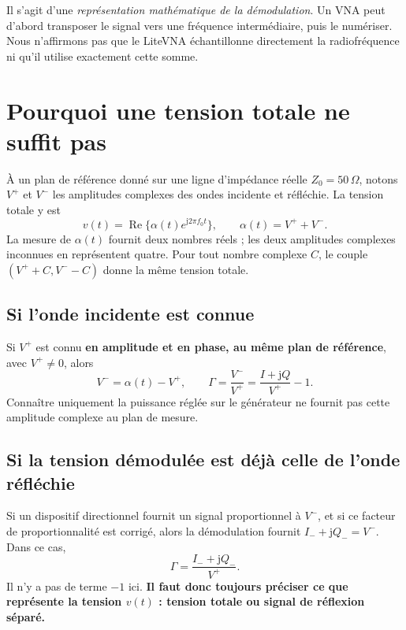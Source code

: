 \documentclass[11pt,a4paper]{article}
\newcommand{\jj}{\mathrm{j}}
\newcommand{\Reel}{\operatorname{Re}}
\begin{document}
Il s'agit d'une \emph{représentation mathématique de la démodulation}.
Un VNA peut d'abord transposer le signal vers une fréquence intermédiaire,
puis le numériser. Nous n'affirmons pas que le LiteVNA échantillonne
directement la radiofréquence ni qu'il utilise exactement cette somme.

\section{Pourquoi une tension totale ne suffit pas}
À un plan de référence donné sur une ligne d'impédance réelle
$Z_0=50\,\Omega$, notons $V^+$ et $V^-$ les amplitudes complexes des ondes
incidente et réfléchie. La tension totale y est
\begin{equation}
 v(t)=\Reel\{\alpha(t)e^{\jj2\pi f_0t}\},
 \qquad \alpha(t)=V^++V^-.
\end{equation}
La mesure de $\alpha(t)$ fournit deux nombres réels ; les deux amplitudes
complexes inconnues en représentent quatre. Pour tout nombre complexe $C$,
le couple $(V^++C,V^--C)$ donne la même tension totale.

\subsection{Si l'onde incidente est connue}
Si $V^+$ est connu \textbf{en amplitude et en phase, au même plan de
référence}, avec $V^+\ne0$, alors
\begin{equation}
 V^-=\alpha(t)-V^+,
 \qquad
 \boxed{\Gamma=\frac{V^-}{V^+}=\frac{I+\jj Q}{V^+}-1.}
\end{equation}
Connaître uniquement la puissance réglée sur le générateur ne fournit pas
cette amplitude complexe au plan de mesure.

\subsection{Si la tension démodulée est déjà celle de l'onde réfléchie}
Si un dispositif directionnel fournit un signal proportionnel à $V^-$,
et si ce facteur de proportionnalité est corrigé, alors la démodulation
fournit $I_-+\jj Q_-=V^-$. Dans ce cas,
\begin{equation}
 \boxed{\Gamma=\frac{I_-+\jj Q_-}{V^+}.}
\end{equation}
Il n'y a pas de terme $-1$ ici. \textbf{Il faut donc toujours préciser ce
que représente la tension $v(t)$ : tension totale ou signal de réflexion séparé.}
\end{document}
